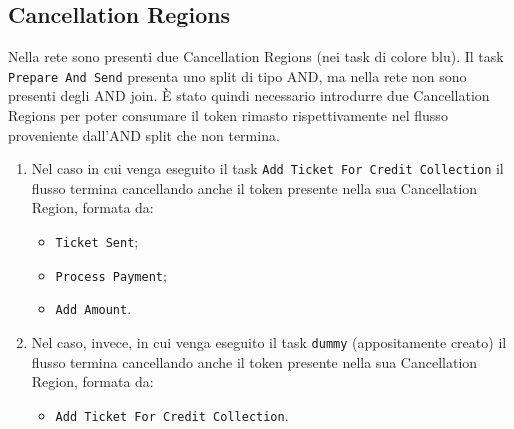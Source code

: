 \documentclass[../Relazione.tex]{subfiles}
\begin{document}
    \subsection{Cancellation Regions} Nella rete sono presenti due Cancellation Regions (nei task di colore blu).
    Il task \texttt{Prepare And Send} presenta uno split di tipo AND, ma nella rete non sono presenti degli AND join. È stato quindi necessario introdurre due Cancellation Regions per poter consumare il token rimasto rispettivamente nel flusso proveniente dall'AND split che non termina.
    \begin{enumerate}
        \item Nel caso in cui venga eseguito il task \texttt{Add Ticket For Credit Collection} il flusso termina cancellando anche il token presente nella sua Cancellation Region, formata da:
        \begin{itemize}
            \item \texttt{Ticket Sent};
            \item \texttt{Process Payment};
            \item \texttt{Add Amount}.
        \end{itemize}
        \item Nel caso, invece, in cui venga eseguito il task \texttt{dummy} (appositamente creato) il flusso termina cancellando anche il token presente nella sua Cancellation Region, formata da:
        \begin{itemize}
            \item \texttt{Add Ticket For Credit Collection}.
        \end{itemize}
    \end{enumerate}
    
\end{document}
